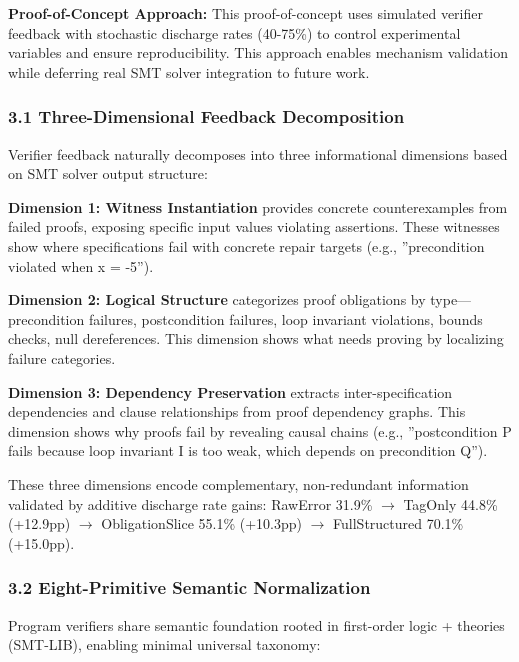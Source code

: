 
\textbf{Proof-of-Concept Approach:} This proof-of-concept uses simulated verifier feedback with stochastic discharge rates (40-75\%) to control experimental variables and ensure reproducibility. This approach enables mechanism validation while deferring real SMT solver integration to future work.

\subsubsection{3.1 Three-Dimensional Feedback Decomposition}

Verifier feedback naturally decomposes into three informational dimensions based on SMT solver output structure:

\textbf{Dimension 1: Witness Instantiation} provides concrete counterexamples from failed proofs, exposing specific input values violating assertions. These witnesses show where specifications fail with concrete repair targets (e.g., ''precondition violated when x = -5'').

\textbf{Dimension 2: Logical Structure} categorizes proof obligations by type---precondition failures, postcondition failures, loop invariant violations, bounds checks, null dereferences. This dimension shows what needs proving by localizing failure categories.

\textbf{Dimension 3: Dependency Preservation} extracts inter-specification dependencies and clause relationships from proof dependency graphs. This dimension shows why proofs fail by revealing causal chains (e.g., ''postcondition P fails because loop invariant I is too weak, which depends on precondition Q'').

These three dimensions encode complementary, non-redundant information validated by additive discharge rate gains: RawError 31.9\% $\rightarrow$ TagOnly 44.8\% (+12.9pp) $\rightarrow$ ObligationSlice 55.1\% (+10.3pp) $\rightarrow$ FullStructured 70.1\% (+15.0pp).

\subsubsection{3.2 Eight-Primitive Semantic Normalization}

Program verifiers share semantic foundation rooted in first-order logic + theories (SMT-LIB), enabling minimal universal taxonomy:


